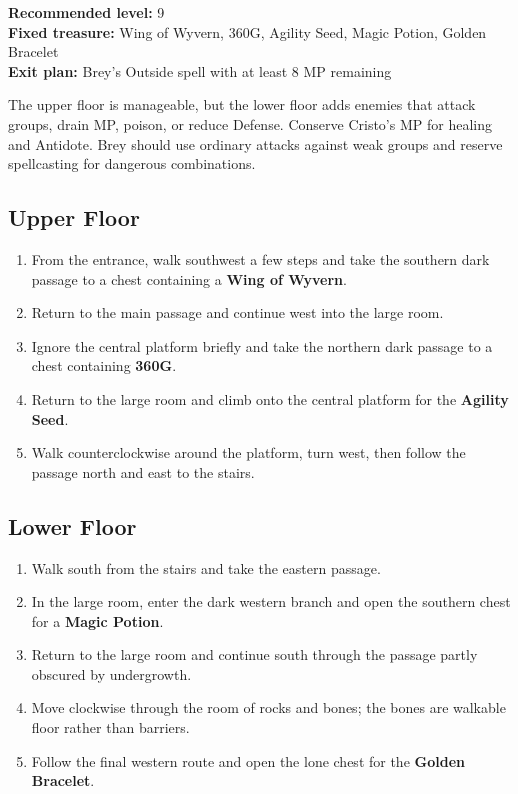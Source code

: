 \documentclass[
  american,
  10pt,
  letterpaper,
  oneside,
  open=any]{scrreprt}
\providecommand{\tightlist}{%
  \setlength{\itemsep}{0pt}\setlength{\parskip}{0pt}}
\begin{document}
\textbf{Recommended level:} 9\\
\textbf{Fixed treasure:} Wing of Wyvern, 360G, Agility Seed, Magic
Potion, Golden Bracelet\\
\textbf{Exit plan:} Brey's Outside spell with at least 8 MP remaining

The upper floor is manageable, but the lower floor adds enemies that
attack groups, drain MP, poison, or reduce Defense. Conserve Cristo's MP
for healing and Antidote. Brey should use ordinary attacks against weak
groups and reserve spellcasting for dangerous combinations.

\subsection{Upper Floor}\label{upper-floor}

\begin{enumerate}
\def\labelenumi{\arabic{enumi}.}
\tightlist
\item
  From the entrance, walk southwest a few steps and take the southern
  dark passage to a chest containing a \textbf{Wing of Wyvern}.
\item
  Return to the main passage and continue west into the large room.
\item
  Ignore the central platform briefly and take the northern dark passage
  to a chest containing \textbf{360G}.
\item
  Return to the large room and climb onto the central platform for the
  \textbf{Agility Seed}.
\item
  Walk counterclockwise around the platform, turn west, then follow the
  passage north and east to the stairs.
\end{enumerate}

\subsection{Lower Floor}\label{lower-floor}

\begin{enumerate}
\def\labelenumi{\arabic{enumi}.}
\tightlist
\item
  Walk south from the stairs and take the eastern passage.
\item
  In the large room, enter the dark western branch and open the southern
  chest for a \textbf{Magic Potion}.
\item
  Return to the large room and continue south through the passage partly
  obscured by undergrowth.
\item
  Move clockwise through the room of rocks and bones; the bones are
  walkable floor rather than barriers.
\item
  Follow the final western route and open the lone chest for the
  \textbf{Golden Bracelet}.
\end{enumerate}
\end{document}
